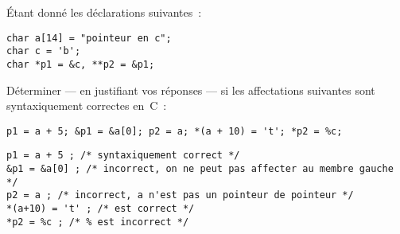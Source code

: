  \'Etant donn\'e les d\'eclarations suivantes~:
\begin{verbatim}
char a[14] = "pointeur en c";
char c = 'b';
char *p1 = &c, **p2 = &p1;
\end{verbatim}
  D\'eterminer --- en justifiant vos r\'eponses --- si les affectations
  suivantes sont syntaxiquement correctes en~C~:
\begin{verbatim}
p1 = a + 5; &p1 = &a[0]; p2 = a; *(a + 10) = 't'; *p2 = %c;
\end{verbatim}
\ifcorrection
\begin{verbatim}
p1 = a + 5 ; /* syntaxiquement correct */
&p1 = &a[0] ; /* incorrect, on ne peut pas affecter au membre gauche */
p2 = a ; /* incorrect, a n'est pas un pointeur de pointeur */
*(a+10) = 't' ; /* est correct */
*p2 = %c ; /* % est incorrect */
\end{verbatim}
\fi
